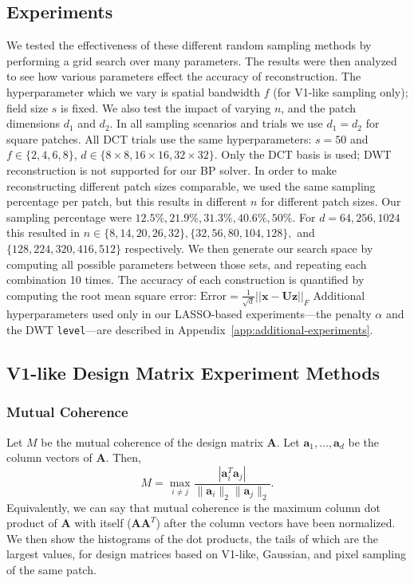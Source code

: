 \documentclass{article}
\renewcommand{\vec}{\mathbf}
\newcommand{\mat}{\mathbf}
\begin{document}
\subsection{Experiments}
We tested the effectiveness of these different random sampling methods by performing a grid search over many parameters.
The results were then analyzed to see how various parameters effect the accuracy of reconstruction.
The hyperparameter which we vary is spatial bandwidth $f$ (for V1-like sampling only); field size $s$ is fixed.
We also test the impact of varying $n$, and the patch dimensions $d_1$ and $d_2$.
In all sampling scenarios and trials we use $d_1 = d_2$ for square patches.
All DCT trials use the same hyperparameters: $s = 50$ and $f \in \{2, 4, 6, 8\}$, $d \in \{8 \times 8, 16 \times 16, 32 \times 32\}$.
Only the DCT basis is used; DWT reconstruction is not supported for our BP solver.
In order to make reconstructing different patch sizes comparable, we used the same sampling percentage per patch, but this results in different $n$ for different patch sizes.
Our sampling percentage were $12.5\%, 21.9\%, 31.3\%, 40.6\%, 50\%$.
For $d = 64, 256, 1024$ this resulted in $n \in \{8, 14, 20, 26, 32\}, \{32, 56, 80, 104, 128\},$ and $\{128, 224, 320, 416, 512\}$ respectively.
We then generate our search space by computing all possible parameters between those sets, and repeating each combination 10 times.
The accuracy of each construction is quantified by computing the root mean square error: $\mathrm{Error} = \frac{1}{\sqrt{d}}||\vec x - \mat U \vec z||_F$
Additional hyperparameters used only in our LASSO-based experiments---the penalty $\alpha$ and the DWT \texttt{level}---are described in Appendix~\ref{app:additional-experiments}.

\subsection{V1-like Design Matrix Experiment Methods}

\subsubsection{Mutual Coherence}

Let $M$ be the mutual coherence of the design matrix $\mat{A}$.
Let $\vec{a}_1, \ldots, \vec{a}_{d}$ be the column vectors of $\mat{A}$. 
Then,
\begin{equation}
    M = \max_{i \neq j} \frac{|\vec{a}_i^T \vec{a}_j|}{\|\vec{a}_i \|_2 \|\vec{a}_j \|_2}.
\end{equation}
Equivalently, we can say that mutual coherence is the maximum column dot product of $\mat{A}$ with itself ($\mat{AA}^T$) after the column vectors have been normalized. 
We then show the histograms of the dot products, the tails of which are the largest values, for design matrices based on V1-like, Gaussian, and pixel sampling of the same patch.
\end{document}
